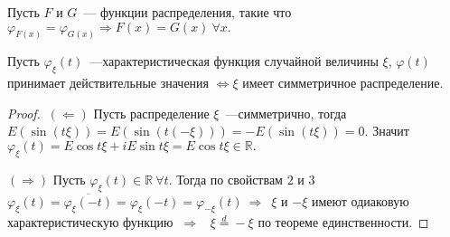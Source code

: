 		\begin{theorem}
		Пусть \(F\) и \(G\)~--- функции распределения, такие что \(\varphi_{F(x)} = \varphi_{G(x)} \Rightarrow F(x) = G(x)~\forall x.\)
	\end{theorem}
	\begin{property}
		Пусть \(\varphi_\xi(t)\)~---характеристическая функция случайной величины \(\xi\), \(\varphi(t)\) принимает действительные значения \(\Leftrightarrow \xi\) имеет симметричное распределение.
		\begin{proof}
			\(~(\Leftarrow)\) Пусть распределение \(\xi\)~---симметрично, тогда \(E(\sin(t\xi)) = E(\sin(t(-\xi))) = -E(\sin(t\xi)) = 0.\) Значит \(\varphi_\xi(t) = E\cos t\xi + iE\sin t\xi = E\cos t\xi \in \mathbb{R}.\)

			\((\Rightarrow)\) Пусть \(\varphi_\xi(t) \in \mathbb{R} ~\forall t.\) Тогда по свойствам \(2\) и \(3\) \(\varphi_\xi(t) = \overline{\varphi_\xi(-t)} = \varphi_\xi(-t) = \varphi_{-\xi}(t) ~\Rightarrow \)~\(\xi\) и \(-\xi\) имеют одиаковую характеристическую функцию \(~\Rightarrow\)~ \(\xi \overset{d}{=} -\xi\) по теореме единственности.
		\end{proof}
	\end{property}

